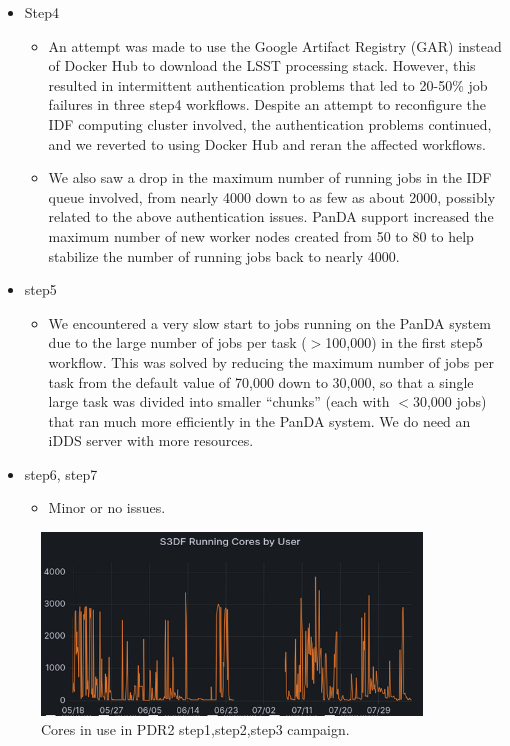 \begin{itemize}
\item Step4
\begin{itemize}

  \item
  An attempt was made to use the Google Artifact Registry (GAR) instead of Docker Hub to download the LSST processing stack.
  However, this resulted in intermittent authentication problems that led to 20-50\% job failures in three step4 workflows.
  Despite an attempt to reconfigure the IDF computing cluster involved, the authentication problems continued, and we reverted to using Docker Hub and reran the affected workflows.

  \item
  We also saw a drop in the maximum number of running jobs in the IDF queue involved, from nearly 4000 down to as few as about 2000, possibly related to the above authentication issues.
  PanDA support increased the maximum number of new worker nodes created from
50 to 80 to help stabilize the number of running jobs back to nearly 4000.


\end{itemize} %

\item step5
\begin{itemize}

  \item
  We encountered a very slow start to jobs running on the PanDA system due to the large number of jobs per task ($>$100,000) in the first step5 workflow.
  This was solved by reducing the maximum number of jobs per task from the default value of 70,000 down to 30,000, so that a single large task was divided into smaller ``chunks'' (each with $<$30,000 jobs) that ran much more efficiently in the PanDA system.
We do need an  iDDS server with more resources.

\end{itemize} %

\item step6, step7
\begin{itemize}

  \item Minor or no issues.

\end{itemize} %

\end{itemize} %

 \begin{figure}
 \includegraphics[width=0.9\textwidth]{Campcorespdr2.png}
         \caption{Cores in use in PDR2 step1,step2,step3 campaign.}  \label{fig:campaigncores}
 \end{figure}



